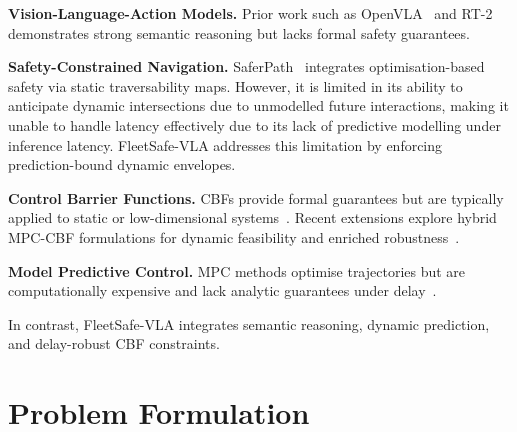 \documentclass[10pt,twocolumn]{article}
\begin{document}
\textbf{Vision-Language-Action Models.}
Prior work such as OpenVLA~\cite{openvla2024} and RT-2~\cite{richter2023rt2} demonstrates strong semantic reasoning but lacks formal safety guarantees.

\textbf{Safety-Constrained Navigation.}
SaferPath~\cite{zhang2026saferpath} integrates optimisation-based safety via static traversability maps. However, it is limited in its ability to anticipate dynamic intersections due to unmodelled future interactions, making it unable to handle latency effectively due to its lack of predictive modelling under inference latency. FleetSafe-VLA addresses this limitation by enforcing prediction-bound dynamic envelopes.

\textbf{Control Barrier Functions.}
CBFs provide formal guarantees but are typically applied to static or low-dimensional systems~\cite{ames2017cbf}. Recent extensions explore hybrid MPC-CBF formulations for dynamic feasibility and enriched robustness~\cite{zeng2021mpccbf, dawson2023cbfsurvey}.

\textbf{Model Predictive Control.}
MPC methods optimise trajectories but are computationally expensive and lack analytic guarantees under delay~\cite{grandia2021mpc}.

In contrast, FleetSafe-VLA integrates semantic reasoning, dynamic prediction, and delay-robust CBF constraints.

\section{Problem Formulation}
\label{sec:problem}
\end{document}
